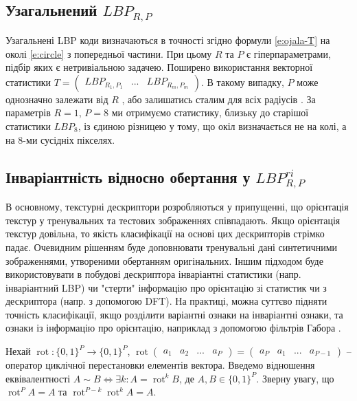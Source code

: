 \subsection{Узагальнений \(LBP_{R,P}\)}\label{section1.1.a}\hfill

Узагальнені LBP коди \cite{ojala2002} визначаються в точності згідно формули \ref{e:ojala-T} на околі \ref{e:circle} з попередньої частини.
При цьому $R$ та $P$ є гіперпараметрами, підбір яких є нетривіальною задачею.
Поширено використання векторної статистики $T = \begin{pmatrix}
    LBP_{R_1,P_1} & ... & LBP_{R_m,P_m}
\end{pmatrix}$. В такому випадку, $P$ може однозначно залежати від $R$ \cite{fastlbp2024}, або залишатись сталим для всіх радіусів \cite{huawudeng2004}.
За параметрів $R=1$, $P=8$ ми отримуємо статистику, близьку до старішої статистики $LBP_8$, із єдиною різницею у тому, що окіл визначається не на колі, а на 8-ми сусідніх пікселях.


\subsection{Інваріантність відносно обертання у \(LBP_{R,P}^{ri}\)}\label{section1.1.c}\hfill

В основному, текстурні дескриптори розробляються у припущенні, що орієнтація текстур у тренувальних та тестових зображеннях співпадають.
Якщо орієнтація текстур довільна, то якість класифікації на основі цих дескрипторів стрімко падає. 
Очевидним рішенням буде доповнювати тренувальні дані синтетичними зображеннями, утвореними обертанням оригінальних. 
Іншим підходом буде використовувати в побудові дескриптора інваріантні статистики (напр. інваріантний LBP) чи 
"стерти"{} інформацію про орієнтацію зі статистик чи з дескриптора (напр. з допомогою DFT). 
На практиці, можна суттєво підняти точність класифікації, якщо розділити варіантні ознаки на інваріантні ознаки, та ознаки із інформацію про орієнтацію, наприклад з допомогою фільтрів Габора \cite{guo2010lbpv}. 

Нехай $\operatorname{rot} : \{0,1\}^P \to \{0,1\}^P$, 
$\operatorname{rot} \begin{pmatrix}a_1 & a_2 & ... & a_P\end{pmatrix} = \begin{pmatrix}a_P & a_1 & ... & a_{P-1}\end{pmatrix}$ 
-- оператор циклічної перестановки елементів вектора.
Введемо відношення еквівалентності $A\sim B \iff \exists k: A = \operatorname{rot}^k B$, де $A,B \in \{0,1\}^P$.
Зверну увагу, що $\operatorname{rot}^P A = A$ та $\operatorname{rot}^{P-k} \operatorname{rot}^k A = A$.

